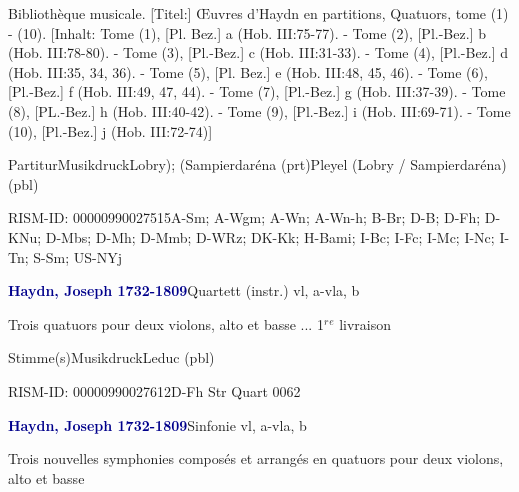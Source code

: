 \documentclass[twocolumn, 12pt]{book}
\begin{document}
\par \begin{itshape}[Umschlagtitel:] Bibliothèque musicale. [Titel:] Œuvres d'Haydn en partitions, Quatuors, tome (1) - (10). [Inhalt: Tome (1), [Pl. Bez.] a (Hob. III:75-77). - Tome (2), [Pl.-Bez.] b (Hob. III:78-80). - Tome (3), [Pl.-Bez.] c (Hob. III:31-33). - Tome (4), [Pl.-Bez.] d (Hob. III:35, 34, 36). - Tome (5), [Pl. Bez.] e (Hob. III:48, 45, 46). - Tome (6), [Pl.-Bez.] f (Hob. III:49, 47, 44). - Tome (7), [Pl.-Bez.] g (Hob. III:37-39). - Tome (8), [PL.-Bez.] h (Hob. III:40-42). - Tome (9), [Pl.-Bez.] i (Hob. III:69-71). - Tome (10), [Pl.-Bez.] j (Hob. III:72-74)]\end{itshape} 
\par \textcolor{darkblue}{}  Partitur\newline Musikdruck\newline Lobry); (Sampierdaréna  (prt)\newline Pleyel (Lobry / Sampierdaréna)  (pbl)
\par RISM-ID: 00000990027515\newline A-Sm; A-Wgm; A-Wn; A-Wn-h; B-Br; D-B; D-Fh; D-KNu; D-Mbs; D-Mh; D-Mmb; D-WRz; DK-Kk; H-Bami; I-Bc; I-Fc; I-Mc; I-Nc; I-Tn; S-Sm; US-NYj
\par \vspace{16pt} \textcolor{darkblue}{\textbf{Haydn, Joseph  1732-1809}}\hfillplus{\textbf{[284]}}\newline Quartett (instr.) vl, a-vla, b
\par \begin{itshape}Trois quatuors pour deux violons, alto et basse ... 1$^r$$^e$ livraison\end{itshape} 
\par \textcolor{darkblue}{}  Stimme(s)\newline Musikdruck\newline Leduc  (pbl)
\par RISM-ID: 00000990027612\newline D-Fh  Str Quart 0062
\par \vspace{16pt} \textcolor{darkblue}{\textbf{Haydn, Joseph  1732-1809}}\hfillplus{\textbf{[285]}}\newline Sinfonie vl, a-vla, b
\par \begin{itshape}Trois nouvelles symphonies composés et arrangés en quatuors pour deux violons, alto et basse\end{itshape} 
\end{document}
